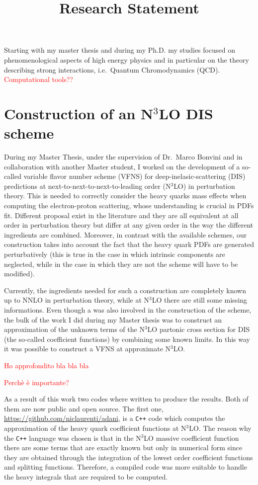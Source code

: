 \documentclass[11pt,a4paper]{moderncv}        %
\title{Research Statement}
\begin{document}
\makecvtitle

Starting with my master thesis and during my Ph.D. my studies focused on phenomenological aspects of high energy physics and in particular on the theory describing strong interactions,
i.e.\ Quantum Chromodynamics (QCD).
\textcolor{red}{Computational tools??}

\section{Construction of an N$^3$LO DIS scheme}

During my Master Thesis, under the supervision of Dr.\ Marco Bonvini and in collaboration with another Master student,
I worked on the development of a so-called variable flavor number scheme (VFNS) for deep-inelasic-scattering (DIS) predictions at
next-to-next-to-next-to-leading order (N$^3$LO) in perturbation theory.
This is needed to correctly consider the heavy quarks mass effects when computing the electron-proton scattering, whose understanding
is crucial in PDFs fit.
Different proposal exist in the literature and they are all equivalent at all order in perturbation theory but differ at any given
order in the way the different ingredients are combined.
Moreover, in contrast with the available schemes, our construction takes into account the fact that the heavy quark PDFs are generated
perturbatively (this is true in the case in which intrinsic components are neglected, while in the case in which they are not the scheme will
have to be modified).

Currently, the ingredients needed for such a construction are completely known up to NNLO in perturbation theory, while at N$^3$LO
there are still some missing informations.
Even though a was also involved in the construction of the scheme, the bulk of the work I did during my Master thesis was to
construct an approximation of the unknown terms of the N$^3$LO partonic cross section for DIS (the so-called coefficient functions) by
combining some known limits.
In this way it was possible to construct a VFNS at approximate N$^3$LO.

\textcolor{red}{Ho approfondito bla bla bla}

\textcolor{red}{Perch\`e \`e importante?}

As a result of this work two codes where written to produce the results.
Both of them are now public and open source.
The first one, \url{https://github.com/niclaurenti/adani}, is a \texttt{C++} code 
which computes the approximation of the heavy quark coefficient functions at N$^3$LO.
The reason why the \texttt{C++} language was chosen is that in the N$^3$LO massive coefficient function there are some terms that are
exactly known but only in numerical form since they are obtained through the integration of the lowest order coefficient functions and
splitting functions.
Therefore, a compiled code was more suitable to handle the heavy integrals that are required to be computed.
\end{document}
